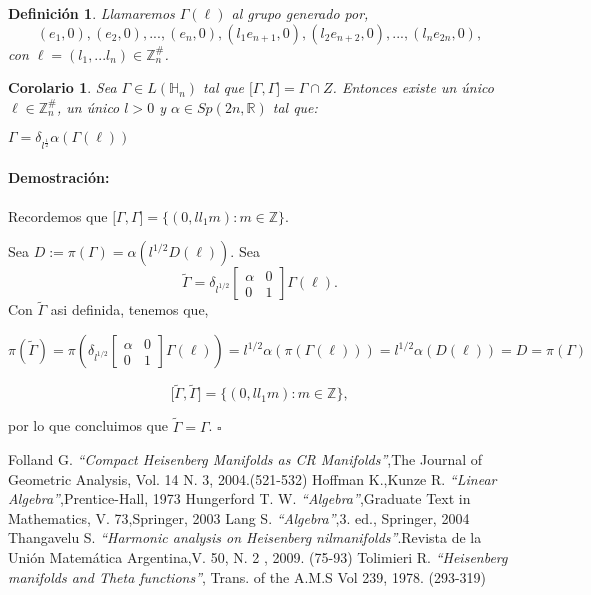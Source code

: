 \documentclass[12pt]{article}
\newtheorem{corollary}{Corolario}
\newtheorem{definition}{Definición}
\newenvironment{proof}{\paragraph{Demostración:}}{\hfill$\square$}
\begin{document}
\begin{definition}
 Llamaremos $\Gamma(\ell)$ al grupo generado por,
 $${(e_1,0),(e_2,0),...,(e_n,0),(l_1 e_{n+1},0),(l_2 e_{n+2},0),...,(l_n e_{2n},0)},$$
 con $\ell=(l_1,...l_n) \in \mathbb{Z}_n^{\#}$.
\end{definition}

\begin{corollary}
 Sea $\Gamma \in L(\mathbb{H}_n)$ tal que ${[}\Gamma,\Gamma{]}=\Gamma \cap Z$. Entonces existe un único $\ell \in  \mathbb{Z}_n^{\#}$, un único $l> 0$  y $\alpha \in Sp(2n,\mathbb{R})$ 
 tal que:
 
 $\Gamma = \delta_{l^{\frac{1}{2}}} \alpha (\Gamma(\ell))$
\end{corollary}
\begin{proof}
 Recordemos que ${[}\Gamma,\Gamma{]}=\{(0,l l_1 m): m\in \mathbb{Z}\}$.
 
 Sea $D:=\pi(\Gamma)=\alpha(l^{1/2} D(\ell))$.
 Sea 
 $$
 \tilde{\Gamma}=   
  \delta_{l^{1/2}}
  \begin{bmatrix}  
    \alpha & 0\\ 
    0& 1
  \end{bmatrix}
  \Gamma(\ell).
$$
 Con $\tilde{\Gamma}$ asi definida, tenemos que,
 
 $$  \pi(\tilde{\Gamma})= 
 \pi(
 \delta_{l^{1/2}}
 \begin{bmatrix}
    \alpha & 0\\ 
    0& 1
  \end{bmatrix}
  \Gamma(\ell)
  )=
  l^{1/2}\alpha(\pi(\Gamma(\ell)))=
  l^{1/2}\alpha(D(\ell))=D=\pi(\Gamma)
  $$
  
  $${[}\tilde{\Gamma},\tilde{\Gamma}{]}=\{(0,l l_1 m): m\in \mathbb{Z}\},  $$
 
 por lo que concluimos que $\tilde{\Gamma}=\Gamma$.
\end{proof}





 \clearpage
  \begin{thebibliography}{1}
  Folland G.  \emph{``Compact Heisenberg Manifolds as CR Manifolds''},The Journal of Geometric Analysis, Vol. 14 N. 3, 2004.(521-532)
  Hoffman K.,Kunze R.  \emph{``Linear Algebra''},Prentice-Hall, 1973  
  Hungerford T. W.  \emph{``Algebra''},Graduate Text in Mathematics, V. 73,Springer, 2003
  Lang S.  \emph{``Algebra''},3. ed., Springer, 2004
  Thangavelu S.  \emph{``Harmonic analysis on Heisenberg nilmanifolds''}.Revista de la Unión Matemática Argentina,V. 50, N. 2 , 2009. (75-93)
  Tolimieri R.   \emph{``Heisenberg manifolds and Theta functions''}, Trans. of the A.M.S Vol 239, 1978. (293-319)
  
  \end{thebibliography}
  
  
  
\end{document}
